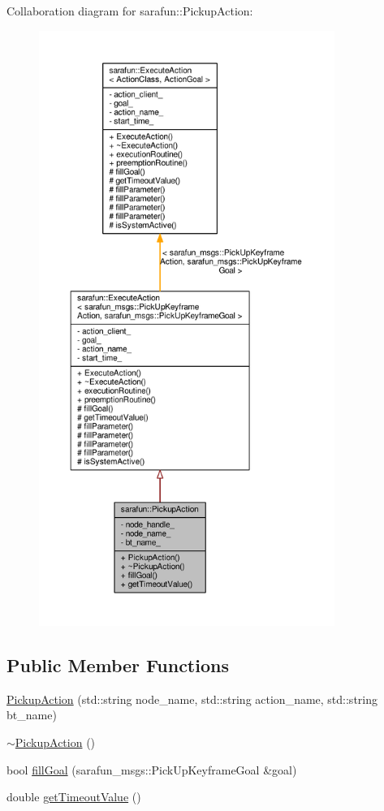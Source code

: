 Collaboration diagram for sarafun\-:\-:Pickup\-Action\-:
\nopagebreak
\begin{figure}[H]
\begin{center}
\leavevmode
\includegraphics[height=550pt]{d5/da2/classsarafun_1_1PickupAction__coll__graph}
\end{center}
\end{figure}
\subsection*{Public Member Functions}
\begin{DoxyCompactItemize}
\item 
\hyperlink{classsarafun_1_1PickupAction_a1663ebd551413acbc5f21e86a0e3b8cc_a1663ebd551413acbc5f21e86a0e3b8cc}{Pickup\-Action} (std\-::string node\-\_\-name, std\-::string action\-\_\-name, std\-::string bt\-\_\-name)
\item 
\hyperlink{classsarafun_1_1PickupAction_acadfc84a0339caa9cc02c5d599e6aaeb_acadfc84a0339caa9cc02c5d599e6aaeb}{$\sim$\-Pickup\-Action} ()
\item 
bool \hyperlink{classsarafun_1_1PickupAction_a4aa9956733de9f12b52aa41038dbe87a_a4aa9956733de9f12b52aa41038dbe87a}{fill\-Goal} (sarafun\-\_\-msgs\-::\-Pick\-Up\-Keyframe\-Goal \&goal)
\item 
double \hyperlink{classsarafun_1_1PickupAction_a02643cdc836095102e5622b660233f26_a02643cdc836095102e5622b660233f26}{get\-Timeout\-Value} ()
\end{DoxyCompactItemize}
